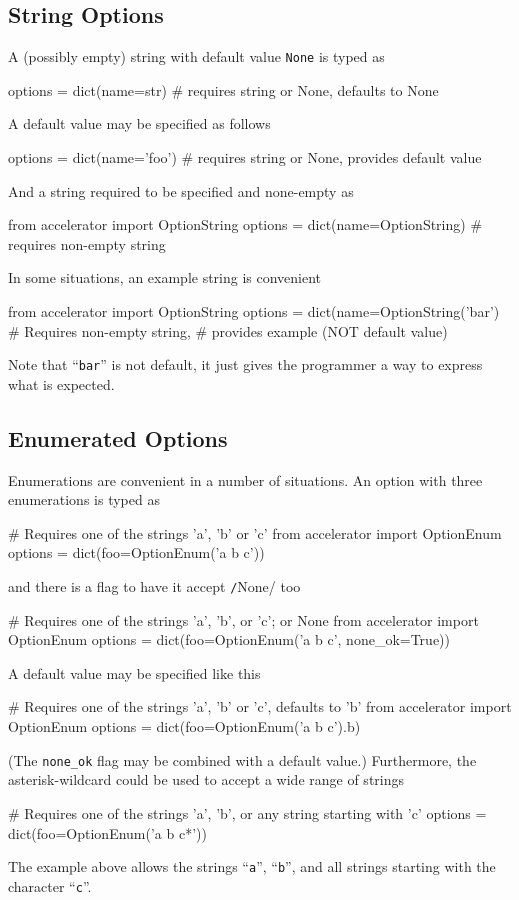 \subsection{String Options}
A (possibly empty) string with default value \texttt{None} is typed as
\begin{python}
options = dict(name=str)     # requires string or None, defaults to None
\end{python}
A default value may be specified as follows
\begin{python}
options = dict(name='foo')   # requires string or None, provides default value
\end{python}
And a string required to be specified and none-empty as
\begin{python}
from accelerator import OptionString
options = dict(name=OptionString)       # requires non-empty string
\end{python}
In some situations, an example string is convenient
\begin{python}
from accelerator import OptionString
options = dict(name=OptionString('bar') # Requires non-empty string,
                                        # provides example (NOT default value)
\end{python}
Note that ``\texttt{bar}'' is not default, it just gives the
programmer a way to express what is expected.



\subsection{Enumerated Options}
Enumerations are convenient in a number of situations.  An option with
three enumerations is typed as
\begin{python}
# Requires one of the strings 'a', 'b' or 'c'
from accelerator import OptionEnum
options = dict(foo=OptionEnum('a b c'))
\end{python}
and there is a flag to have it accept \texttt/None/ too
\begin{python}
# Requires one of the strings 'a', 'b', or 'c'; or None
from accelerator import OptionEnum
options = dict(foo=OptionEnum('a b c', none_ok=True))
\end{python}
A default value may be specified like this
\begin{python}
# Requires one of the strings 'a', 'b' or 'c', defaults to 'b'
from accelerator import OptionEnum
options = dict(foo=OptionEnum('a b c').b)
\end{python}
(The \texttt{none\_ok} flag may be combined with a default value.)
Furthermore, the asterisk-wildcard could be used to accept a wide
range of strings
\begin{python}
# Requires one of the strings 'a', 'b', or any string starting with 'c'
options = dict(foo=OptionEnum('a b c*'))
\end{python}
The example above allows the strings ``\texttt{a}'', ``\texttt{b}'',
and all strings starting with the character ``\texttt{c}''.



